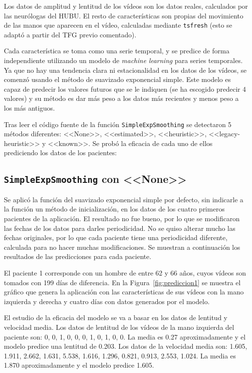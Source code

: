 Los datos de amplitud y lentitud de los vídeos son los datos reales, calculados por las neurólogas del HUBU. El resto de características son propias del movimiento de las manos que aparecen en el vídeo, calculadas mediante \texttt{tsfresh} (esto se adaptó a partir del TFG previo comentado).

Cada característica se toma como una serie temporal, y se predice de forma independiente utilizando un modelo de \textit{machine learning} para series temporales. Ya que no hay una tendencia clara ni estacionalidad en los datos de los vídeos, se comenzó usando el método de suavizado exponencial simple. Este modelo es capaz de predecir los valores futuros que se le indiquen (se ha escogido predecir 4 valores) y su método es dar más peso a los datos más recientes y menos peso a los más antiguos.

Tras leer el código fuente de la función \texttt{SimpleExpSmoothing} se detectaron 5 métodos diferentes: <<None>>, <<estimated>>, <<heuristic>>, <<legacy-heuristic>> y <<known>>. Se probó la eficacia de cada uno de ellos prediciendo los datos de los pacientes:


\subsection{\texttt{SimpleExpSmoothing} con <<None>>}
Se aplicó la función del suavizado exponencial simple por defecto, sin indicarle a la función un método de inicialización, en los datos de los cuatro primeros pacientes de la aplicación. El resultado no fue bueno, por lo que se modificaron las fechas de los datos para darles periodicidad. No se quiso alterar mucho las fechas originales, por lo que cada paciente tiene una periodicidad diferente, calculada para no hacer muchas modificaciones. Se muestran a continuación los resultados de las predicciones para cada paciente.

El paciente 1 corresponde con un hombre de entre 62 y 66 años, cuyos vídeos son tomados con 199 días de diferencia. En la Figura~\ref{fig:prediccion1} se muestra el gráfico que genera la aplicación con las características de sus vídeos con la mano izquierda y derecha y cuatro días con datos generados por el modelo.

El estudio de la eficacia del modelo se va a basar en los datos de lentitud y velocidad media.
Los datos de lentitud de los vídeos de la mano izquierda del paciente son: 0, 0, 1, 0, 0, 0, 1, 0, 1, 0, 0. La media es 0.27 aproximadamente y el modelo predice una lentitud de 0.203. 
Los datos de la velocidad media son: 1.605, 1.911, 2.662, 1.631, 5.538, 1.616, 1.296, 0.821, 0.913, 2.553, 1.024. La media es 1.870 aproximadamente y el modelo predice 1.605. 

